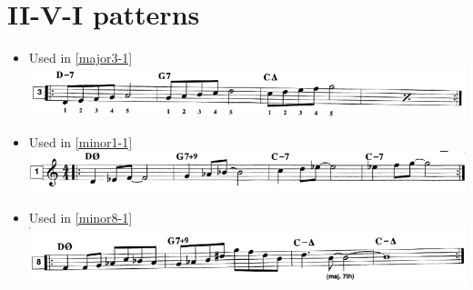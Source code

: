 \documentclass[letterpaper]{article}
\begin{document}
\section*{II-V-I patterns}
\begin{itemize}
\item Used in \cref{major3-1}
\newline\newline
\includegraphics[width=0.8\linewidth]{scans251/major3.png}\item Used in \cref{minor1-1}
\newline\newline
\includegraphics[width=0.8\linewidth]{scans251/minor1.png}\item Used in \cref{minor8-1}
\newline\newline
\includegraphics[width=0.8\linewidth]{scans251/minor8.png}
\end{itemize}
\end{document}
